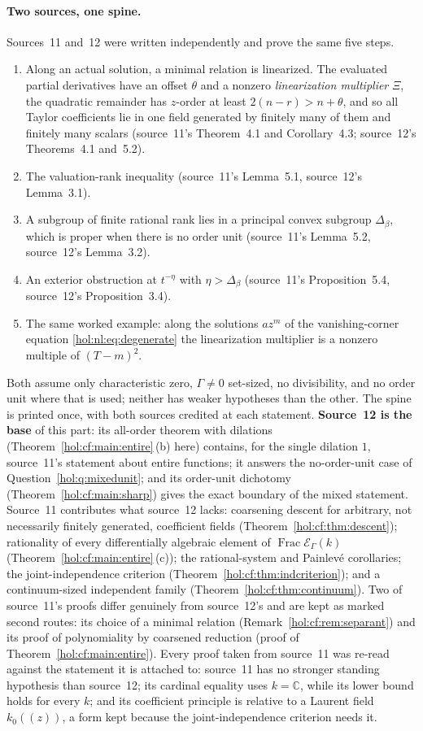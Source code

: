 \documentclass[11pt]{article}
\numberwithin{equation}{section}
\theoremstyle{definition}
\theoremstyle{remark}
\newcommand{\C}{\mathbb C}
\newcommand{\EK}{\mathcal E_\Gamma(k)}
\newcommand{\FE}{\operatorname{Frac}\EK}
\begin{document}
\paragraph{Two sources, one spine.}
Sources~11 and~12 were written independently and prove the same five steps.
\begin{enumerate}[label=\textup{(\arabic*)}]
\item Along an actual solution, a minimal relation is linearized. The
evaluated partial derivatives have an offset $\theta$ and a nonzero
\emph{linearization multiplier} $\Xi$, the quadratic remainder has
$z$-order at least $2(n-r)>n+\theta$, and so all Taylor coefficients lie in
one field generated by finitely many of them and finitely many scalars
(source~11's Theorem~4.1 and Corollary~4.3; source~12's Theorems~4.1
and~5.2).
\item The valuation-rank inequality (source~11's Lemma~5.1, source~12's
Lemma~3.1).
\item A subgroup of finite rational rank lies in a principal convex subgroup
$\Delta_\beta$, which is proper when there is no order unit (source~11's
Lemma~5.2, source~12's Lemma~3.2).
\item An exterior obstruction at $t^{-\eta}$ with $\eta>\Delta_\beta$
(source~11's Proposition~5.4, source~12's Proposition~3.4).
\item The same worked example: along the solutions $az^m$ of the
vanishing-corner equation \eqref{hol:nl:eq:degenerate} the linearization
multiplier is a nonzero multiple of $(T-m)^2$.
\end{enumerate}
Both assume only characteristic zero, $\Gamma\ne0$ set-sized, no divisibility,
and no order unit where that is used; neither has weaker hypotheses than the
other. The spine is printed once, with both sources credited at each
statement. \textbf{Source~12 is the base} of this part: its all-order theorem
with dilations (Theorem~\ref{hol:cf:main:entire}\,(b) here) contains, for the
single dilation $1$, source~11's statement about entire functions; it answers
the no-order-unit case of Question~\ref{hol:q:mixedunit}; and its order-unit
dichotomy (Theorem~\ref{hol:cf:main:sharp}) gives the exact boundary of the
mixed statement. Source~11 contributes what source~12 lacks: coarsening
descent for arbitrary, not necessarily finitely generated, coefficient fields
(Theorem~\ref{hol:cf:thm:descent}); rationality of every differentially
algebraic element of $\FE$ (Theorem~\ref{hol:cf:main:entire}\,(c)); the
rational-system and Painlev\'e corollaries; the joint-independence criterion
(Theorem~\ref{hol:cf:thm:indcriterion}); and a continuum-sized independent
family (Theorem~\ref{hol:cf:thm:continuum}). Two of source~11's proofs differ
genuinely from source~12's and are kept as marked second routes:
its choice of a minimal relation (Remark~\ref{hol:cf:rem:separant}) and its
proof of polynomiality by coarsened reduction (proof of
Theorem~\ref{hol:cf:main:entire}). Every proof taken from source~11 was
re-read against the statement it is attached to: source~11 has no stronger
standing hypothesis than source~12; its cardinal equality uses $k=\C$, while
its lower bound holds for every $k$; and its coefficient principle is
relative to a Laurent field $k_0((z))$, a form kept because the
joint-independence criterion needs it.
\end{document}
